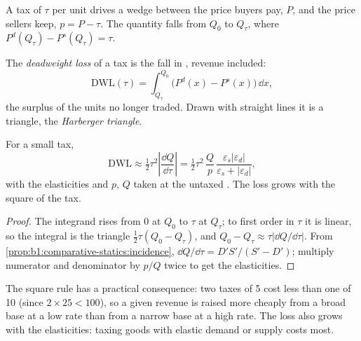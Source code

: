 A tax of $\tau$ per unit drives a wedge between the price buyers pay, $P$, and
the price sellers keep, $p = P - \tau$. The quantity falls from $Q_0$ to $Q_\tau$,
where $P^d(Q_\tau) - P^s(Q_\tau) = \tau$.

\begin{definition}\label{def:b1:partial-equilibrium-welfare:dwl}
The \emph{deadweight loss} of a tax is the fall in , revenue
included:
\[
\mathrm{DWL}(\tau) = \int_{Q_\tau}^{Q_0}\bigl(P^d(x) - P^s(x)\bigr)\,\dd x,
\]
the surplus of the units no longer traded. Drawn with straight lines it is
a triangle, the \emph{Harberger triangle}.
\end{definition}

\begin{proposition}\label{prop:b1:partial-equilibrium-welfare:harberger}
For a small tax,
\[
\mathrm{DWL} \approx \tfrac12\tau^2\left|\frac{\dd Q}{\dd\tau}\right| = \tfrac12\tau^2\,\frac Qp\,\frac{\varepsilon_s|\varepsilon_d|}{\varepsilon_s + |\varepsilon_d|},
\]
with the elasticities and $p$, $Q$ taken at the untaxed . The loss
grows with the square of the tax.
\end{proposition}

\begin{proof}
The integrand rises from 0 at $Q_0$ to $\tau$ at $Q_\tau$; to first order in $\tau$ it is
linear, so the integral is the triangle $\tfrac12\tau(Q_0 - Q_\tau)$, and
$Q_0 - Q_\tau \approx \tau|\dd Q/\dd\tau|$. From
\cref{prop:b1:comparative-statics:incidence},
$\dd Q/\dd\tau = D'S'/(S' - D')$; multiply numerator and denominator by $p/Q$
twice to get the elasticities.
\end{proof}

The square rule has a practical consequence: two taxes of 5 cost less than
one of 10 (since $2 \times 25 < 100$), so a given revenue is raised more cheaply
from a broad base at a low rate than from a narrow base at a high rate. The
loss also grows with the elasticities: taxing goods with elastic demand or
supply costs most.

